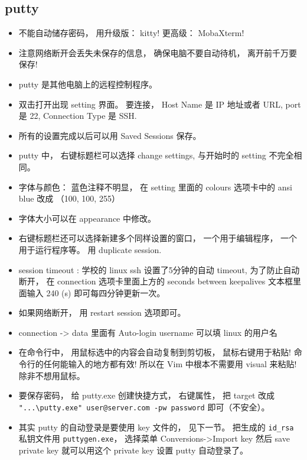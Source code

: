 \subsection{putty}
\begin{itemize}
\item 不能自动储存密码， 用升级版： kitty! 更高级： MobaXterm!
\item 注意网络断开会丢失未保存的信息， 确保电脑不要自动待机， 离开前千万要保存!
\item putty 是其他电脑上的远程控制程序。
\item 双击打开出现 setting 界面。 要连接， Host Name 是 IP 地址或者 URL, port 是 22, Connection Type 是 SSH.
\item 所有的设置完成以后可以用 Saved Sessions 保存。
\item putty 中， 右键标题栏可以选择 change settings, 与开始时的 setting 不完全相同。
\item 字体与颜色： 蓝色注释不明显， 在 setting 里面的 colours 选项卡中的 ansi blue 改成 （100, 100, 255）
\item 字体大小可以在 appearance 中修改。
\item 右键标题栏还可以选择新建多个同样设置的窗口， 一个用于编辑程序， 一个用于运行程序等。 用 duplicate session.
\item session timeout : 学校的 linux ssh 设置了5分钟的自动 timeout, 为了防止自动断开， 在 connection 选项卡里面上方的 seconds between keepalives 文本框里面输入 240 (s) 即可每四分钟更新一次。
\item 如果网络断开， 用 restart session 选项即可。
\item connection -> data 里面有 Auto-login username 可以填 linux 的用户名
\item 在命令行中， 用鼠标选中的内容会自动复制到剪切板， 鼠标右键用于粘贴! 命令行的任何能输入的地方都有效! 所以在 Vim 中根本不需要用 visual 来粘贴! 除非不想用鼠标。
\item 要保存密码， 给 putty.exe 创建快捷方式， 右键属性， 把 target 改成 \verb|"...\putty.exe" user@server.com -pw password| 即可（不安全）。
\item 其实 putty 的自动登录是要使用 key 文件的， 见下一节。 把生成的 \verb|id_rsa| 私钥文件用 \verb|puttygen.exe|， 选择菜单 Conversions->Import key 然后 save private key 就可以用这个 private key 设置 putty 自动登录了。
\end{itemize}

